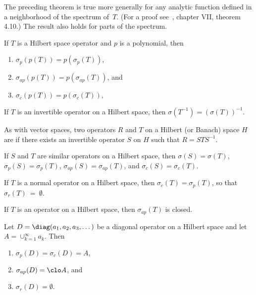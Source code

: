The preceding theorem is true more generally for any analytic function defined in a neighborhood of the spectrum of~$T$.
(For a proof see~\cite{Conway:1990}, chapter VII, theorem 4.10.)  The result also holds for parts of the spectrum.

\begin{prop} If $T$ is a Hilbert space operator and $p$ is a polynomial, then
   \begin{enumerate}[label=\rm{(\alph*)}]
     \item $\sigma_p(p(T)) = p(\sigma_p(T))$,
     \item $\sigma_{ap}(p(T)) = p(\sigma_{ap}(T))$, and
     \item $\sigma_c(p(T)) = p(\sigma_c(T))$,
   \end{enumerate}
\end{prop}

\begin{prop}
    If $T$ is an invertible operator on a Hilbert space, then  $\sigma(T^{-1}) = (\sigma(T))^{-1}$.
\end{prop}

\begin{defn}\label{defn_similar_Hsp_ops} As with vector spaces, two operators $R$ and $T$ on a Hilbert (or Banach) space $H$ are
 if there exists an invertible operator $S$ on $H$ such that $R = STS^{-1}$.
\end{defn}

\begin{prop} If $S$ and $T$ are similar operators on a Hilbert space, then $\sigma(S) = \sigma(T)$, $\sigma_p(S) = \sigma_p(T)$,
$\sigma_{ap}(S) = \sigma_{ap}(T)$, and $\sigma_c(S) = \sigma_c(T)$.
\end{prop}

\begin{prop} If $T$ is a normal operator on a Hilbert space, then $\sigma_c(T) = \sigma_p(T)$, so that $\sigma_r(T)~=~\emptyset$.
\end{prop}

\begin{prop} If $T$ is an operator on a Hilbert space, then $\sigma_{ap}(T)$ is closed.
\end{prop}

\begin{exam} Let $D = \diag(a_1,a_2,a_3,\dots)$ be a diagonal operator on a Hilbert space and let
$A = \cup_{k=1}^\infty a_k$. Then
   \begin{enumerate}[label=(\alph*)]
     \item $\sigma_p(D) = \sigma_c(D) = A$,
     \item $\sigma_{ap}(D) = \clo A$, and
     \item $\sigma_r(D) = \emptyset$.
   \end{enumerate}
\end{exam}

